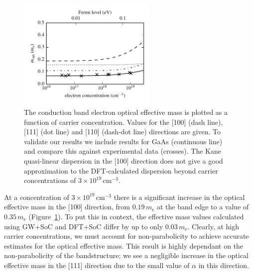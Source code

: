 \begin{figure}[tb] \centering
\includegraphics[width=0.6\textwidth]{./figures/ch4/optical_mass_concentration_MAPI.pdf}
\caption[Electron effective mass as a function of carrier concentration]{\label{optical_concentration_plot} The conduction band electron optical effective mass is plotted as a function of carrier concentration. Values for the [100] (dash line), [111] (dot line) and [110] (dash-dot line) directions are given. To validate our results we include results for GaAs (continuous line) and compare this against experimental data (crosses).\autocite{Raymond1979} The Kane quasi-linear dispersion in the [100] direction does not give a good approximation to the DFT-calculated dispersion beyond carrier concentrations of $3\!\times\!10^{19}\,\mathrm{cm}^{-3}$. }
\end{figure}

At a concentration of $3\!\times\!10^{19}\,\mathrm{cm}^{-3}$ there is a significant increase in the optical effective mass in the [100] direction, from $0.19\,m_\text{e}$ at the band edge to a value of $0.35\,m_\text{e}$ (Figure\ \ref{optical_concentration_plot}). 
To put this in context, the effective mass values calculated using GW+SoC and DFT+SoC differ by up to only $0.03\,m_\text{e}$.\autocite{Umari2014}
Clearly, at high carrier concentrations, we must account for non-parabolicity to achieve accurate estimates for the optical effective mass.
This result is highly dependant on the non-parabolicity of the bandstructure; we see a negligible increase in the optical effective mass in the [111] direction due to the small value of $\alpha$ in this direction. 

